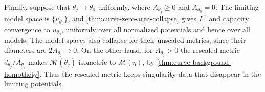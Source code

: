 Finally, suppose that $\theta_j\to\theta_0$ uniformly, where $A_{\theta_j}\geq0$ and $A_{\theta_0}=0$. The limiting model space is $\{u_{\theta_0}\}$, and \cref{thm:curve-zero-area-collapse} gives $L^1$ and capacity convergence to $u_{\theta_0}$, uniformly over all normalized potentials and hence over all models. The model spaces also collapse for their unscaled metrics, since their diameters are $2A_{\theta_j}\to0$. On the other hand, for $A_{\theta_j}>0$ the rescaled metric $d_{\theta_j}/A_{\theta_j}$ makes $\mathcal M(\theta_j)$ isometric to $\mathcal M(\eta)$, by \cref{thm:curve-background-homothety}. Thus the rescaled metric keeps singularity data that disappear in the limiting potentials.





\par\endgroup
